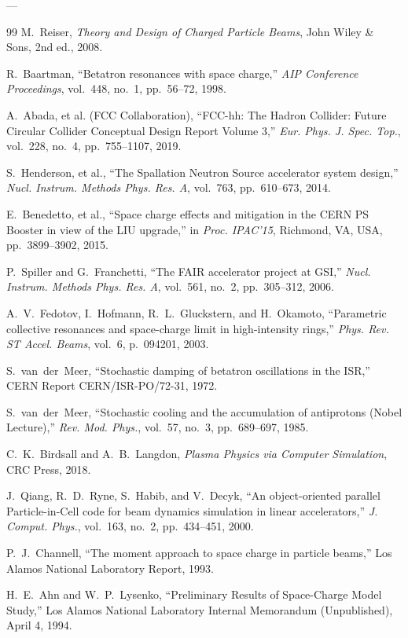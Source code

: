 \documentclass[11pt,a4paper]{article}
\begin{document}
---

\begin{thebibliography}{99}
M.~Reiser, \emph{Theory and Design of Charged Particle Beams}, John Wiley \& Sons, 2nd ed., 2008.

R.~Baartman, ``Betatron resonances with space charge,'' \emph{AIP Conference Proceedings}, vol.~448, no.~1, pp.~56--72, 1998.

A.~Abada, et al. (FCC Collaboration), ``FCC-hh: The Hadron Collider: Future Circular Collider Conceptual Design Report Volume 3,'' \emph{Eur. Phys. J. Spec. Top.}, vol.~228, no.~4, pp.~755--1107, 2019.

S.~Henderson, et al., ``The Spallation Neutron Source accelerator system design,'' \emph{Nucl. Instrum. Methods Phys. Res. A}, vol.~763, pp.~610--673, 2014.

E.~Benedetto, et al., ``Space charge effects and mitigation in the CERN PS Booster in view of the LIU upgrade,'' in \emph{Proc. IPAC'15}, Richmond, VA, USA, pp.~3899--3902, 2015.

P.~Spiller and G.~Franchetti, ``The FAIR accelerator project at GSI,'' \emph{Nucl. Instrum. Methods Phys. Res. A}, vol.~561, no.~2, pp.~305--312, 2006.

A.~V.~Fedotov, I.~Hofmann, R.~L.~Gluckstern, and H.~Okamoto, ``Parametric collective resonances and space-charge limit in high-intensity rings,'' \emph{Phys. Rev. ST Accel. Beams}, vol.~6, p.~094201, 2003.

S.~van~der~Meer, ``Stochastic damping of betatron oscillations in the ISR,'' CERN Report CERN/ISR-PO/72-31, 1972.

S.~van~der~Meer, ``Stochastic cooling and the accumulation of antiprotons (Nobel Lecture),'' \emph{Rev. Mod. Phys.}, vol.~57, no.~3, pp.~689--697, 1985.

C.~K.~Birdsall and A.~B.~Langdon, \emph{Plasma Physics via Computer Simulation}, CRC Press, 2018.

J.~Qiang, R.~D.~Ryne, S.~Habib, and V.~Decyk, ``An object-oriented parallel Particle-in-Cell code for beam dynamics simulation in linear accelerators,'' \emph{J. Comput. Phys.}, vol.~163, no.~2, pp.~434--451, 2000.

P.~J.~Channell, ``The moment approach to space charge in particle beams,'' Los Alamos National Laboratory Report, 1993.

H.~E.~Ahn and W.~P.~Lysenko, ``Preliminary Results of Space-Charge Model Study,'' Los Alamos National Laboratory Internal Memorandum (Unpublished), April 4, 1994.
\end{thebibliography}
\end{document}
